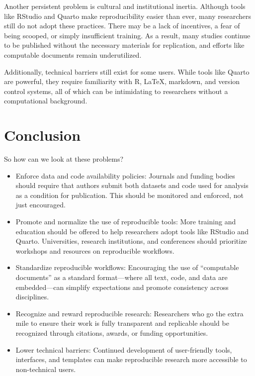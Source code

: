 \documentclass[
  a4paper,
]{article}
\providecommand{\tightlist}{%
  \setlength{\itemsep}{0pt}\setlength{\parskip}{0pt}}\usepackage{longtable,booktabs,array}
\begin{document}
Another persistent problem is cultural and institutional inertia.
Although tools like RStudio and Quarto make reproducibility easier than
ever, many researchers still do not adopt these practices. There may be
a lack of incentives, a fear of being scooped, or simply insufficient
training. As a result, many studies continue to be published without the
necessary materials for replication, and efforts like computable
documents remain underutilized.

Additionally, technical barriers still exist for some users. While tools
like Quarto are powerful, they require familiarity with R, LaTeX,
markdown, and version control systems, all of which can be intimidating
to researchers without a computational background.

\section{Conclusion}\label{conclusion}

So how can we look at these problems?

\begin{itemize}
\tightlist
\item
  Enforce data and code availability policies: Journals and funding
  bodies should require that authors submit both datasets and code used
  for analysis as a condition for publication. This should be monitored
  and enforced, not just encouraged.
\item
  Promote and normalize the use of reproducible tools: More training and
  education should be offered to help researchers adopt tools like
  RStudio and Quarto. Universities, research institutions, and
  conferences should prioritize workshops and resources on reproducible
  workflows.
\item
  Standardize reproducible workflows: Encouraging the use of
  ``computable documents'' as a standard format---where all text, code,
  and data are embedded---can simplify expectations and promote
  consistency across disciplines.
\item
  Recognize and reward reproducible research: Researchers who go the
  extra mile to ensure their work is fully transparent and replicable
  should be recognized through citations, awards, or funding
  opportunities.
\item
  Lower technical barriers: Continued development of user-friendly
  tools, interfaces, and templates can make reproducible research more
  accessible to non-technical users.
\end{itemize}
\end{document}
